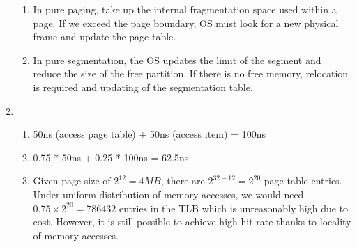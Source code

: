 \documentclass[12pt, a4paper]{article}
\begin{document}
\begin{enumerate}[Q\arabic*.]
\begin{enumerate}[(\alph*.)]
      \item In pure paging, take up the internal fragmentation space used within a page. If we exceed the page boundary, OS must look for a new physical frame and update the page table.

      \item In pure segmentation, the OS updates the limit of the segment and reduce the size of the free partition. If there is no free memory, relocation is required and updating of the segmentation table.
    \end{enumerate}

  \item 
    \begin{enumerate}[(\alph*.)]
      \item 50ns (access page table) + 50ns (access item) = 100ns 
      \item 0.75 * 50ns + 0.25 * 100ns = 62.5ns
      \item Given page size of $2^12 = 4MB$, there are $2^{32- 12} = 2^20$ page table entries. Under uniform distribution of memory accesses, we would need $0.75 \times 2^20 = 786432$ entries in the TLB which is unreasonably high due to cost. However, it is still possible to achieve high hit rate thanks to locality of memory accesses.
    \end{enumerate}
\end{enumerate}
\end{document}
